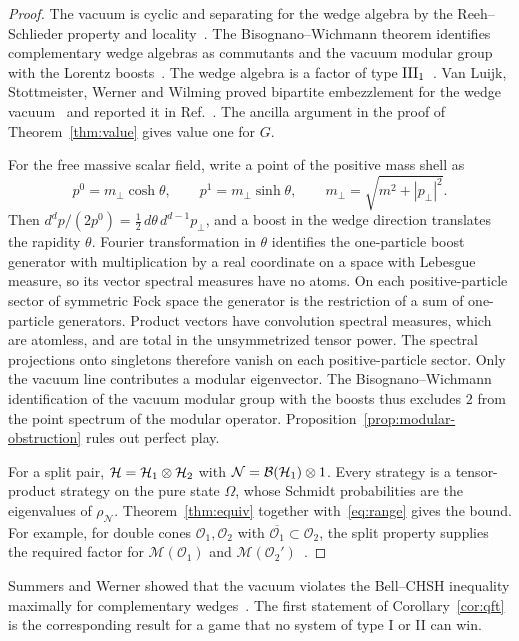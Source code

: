 \begin{proof}
The vacuum is cyclic and separating for the wedge algebra by the Reeh--Schlieder property
and locality~\cite{Haag}. The Bisognano--Wichmann theorem identifies complementary wedge
algebras as commutants and the vacuum modular group with the Lorentz
boosts~\cite{BisognanoWichmann75}. The wedge algebra is a factor of type
$\mathrm{III}_1$~\cite{Driessler75,Haag}. Van Luijk, Stottmeister, Werner and Wilming proved
bipartite embezzlement for the wedge vacuum~\cite[Theorem~97]{vLSWW24} and reported it in
Ref.~\cite{vLSWWPRL24}. The ancilla argument in the proof of Theorem~\ref{thm:value} gives
value one for $G$.

For the free massive scalar field, write a point of the positive mass shell as
\[
 p^0=m_\perp\cosh\theta,\qquad p^1=m_\perp\sinh\theta,
 \qquad m_\perp=\sqrt{m^2+|p_\perp|^2}.
\]
Then $d^dp/(2p^0)=\tfrac12\,d\theta\,d^{d-1}p_\perp$, and a boost in the wedge direction
translates the rapidity $\theta$. Fourier transformation in $\theta$ identifies the
one-particle boost generator with multiplication by a real coordinate on a space with
Lebesgue measure, so its vector spectral measures have no atoms. On each positive-particle
sector of symmetric Fock space the generator is the restriction of a sum of one-particle
generators. Product vectors have convolution spectral measures, which are atomless, and
are total in the unsymmetrized tensor power. The spectral projections onto singletons
therefore vanish on each positive-particle sector. Only the vacuum line contributes a
modular eigenvector. The Bisognano--Wichmann identification of the vacuum modular group
with the boosts thus excludes $2$ from the point spectrum of the modular operator.
Proposition~\ref{prop:modular-obstruction} rules out perfect play.

For a split pair, $\mathcal{H}=\mathcal{H}_1\otimes\mathcal{H}_2$ with $\mathcal{N}=\mathcal{B}(\mathcal{H}_1)\otimes1$.
Every strategy is a tensor-product strategy on the pure state $\Omega$, whose Schmidt
probabilities are the eigenvalues of $\rho_{\mathcal N}$. Theorem~\ref{thm:equiv}
together with~\eqref{eq:range} gives the bound. For example, for double cones
$\mathcal O_1,\mathcal O_2$ with $\overline{\mathcal O_1}\subset\mathcal O_2$, the split
property supplies the required factor for $\mathcal M(\mathcal O_1)$ and
$\mathcal M(\mathcal O_2')$~\cite{Buchholz74,DoplicherLongo84}.
\end{proof}

Summers and Werner showed that the vacuum violates the Bell--CHSH inequality maximally for
complementary wedges~\cite{SummersWerner87c,SummersWerner87b}. The first statement of
Corollary~\ref{cor:qft} is the corresponding result for a game that no system of type I or II
can win.
